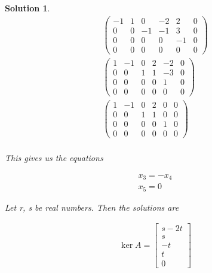\documentclass{article}
\newtheorem*{solution}{Solution}
\begin{document}
\begin{solution}
\begin{align*}
\left( \begin{array}{ccccc|c} -1 & 1 & 0 & -2 & 2 & 0 \\ 0 & 0 & -1 & -1 & 3 & 0 \\ 0 & 0 & 0 & 0 & -1 & 0 \\ 0 & 0 & 0 & 0 & 0 & 0 \end{array} \right) \\
\left( \begin{array}{ccccc|c} 1 & -1 & 0 & 2 & -2 & 0 \\ 0 & 0 & 1 & 1 & -3 & 0 \\ 0 & 0 & 0 & 0 & 1 & 0 \\ 0 & 0 & 0 & 0 & 0 & 0 \end{array} \right) \\
\left( \begin{array}{ccccc|c} 1 & -1 & 0 & 2 & 0 & 0 \\ 0 & 0 & 1 & 1 & 0 & 0 \\ 0 & 0 & 0 & 0 & 1 & 0 \\ 0 & 0 & 0 & 0 & 0 & 0 \end{array} \right) \\
\end{align*}

This gives us the equations

\begin{align*}
x_{3} = -x_{4} \\
x_{5} = 0
\end{align*}

Let r, s be real numbers. Then the solutions are

\begin{align*}
\ker A = \begin{bmatrix}
s - 2t \\ s \\ -t \\ t \\ 0
\end{bmatrix}
\end{align*}

\end{solution}
\end{document}
